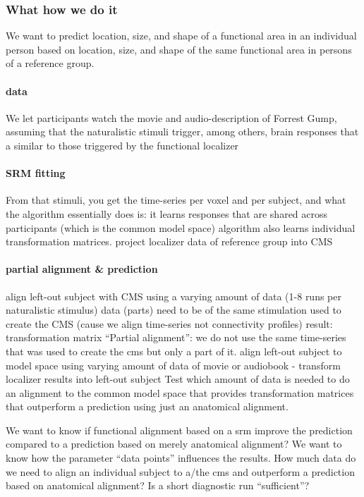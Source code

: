 \subsubsection{What how we do it}
We want to predict location, size, and shape of a functional area in
an individual person based on location, size, and shape of the same functional
area in persons of a reference group.

\paragraph{data}
%
We let participants watch the movie and audio-description of Forrest Gump,
assuming that the naturalistic stimuli trigger, among others, brain responses
that a similar to those triggered by the functional localizer


\paragraph{SRM fitting}

%
From that stimuli, you get the time-series per voxel and per subject, and what
the algorithm essentially does is: it learns responses that are shared across
participants (which is the common model space)
%
algorithm also learns individual transformation matrices.
%
project localizer data of reference group into CMS


\paragraph{partial alignment \& prediction}

%
align left-out subject with CMS using a varying amount of data (1-8 runs per
naturalistic stimulus) data (parts) need to be of the same stimulation used to
create the CMS (cause we align time-series not connectivity profiles) result:
transformation matrix
%
``Partial alignment'': we do not use the same time-series that was used to
create the \ac{cms} but only a part of it.
%
align left-out subject to model space using varying amount of data of
movie or audiobook - transform localizer results into left-out subject
%
Test which amount of data is needed to do an alignment to the common
model space that provides transformation matrices that outperform a prediction
using just an anatomical alignment.

%
We want to know if functional alignment based on a \ac{srm} improve the
prediction compared to a prediction based on merely anatomical alignment?
%
%
We want to know how the parameter ``data points'' influences the results.
%
How much data do we need to align an individual subject to a/the \ac{cms} and
outperform a prediction based on anatomical alignment?
%
Is a short diagnostic run ``sufficient''?

